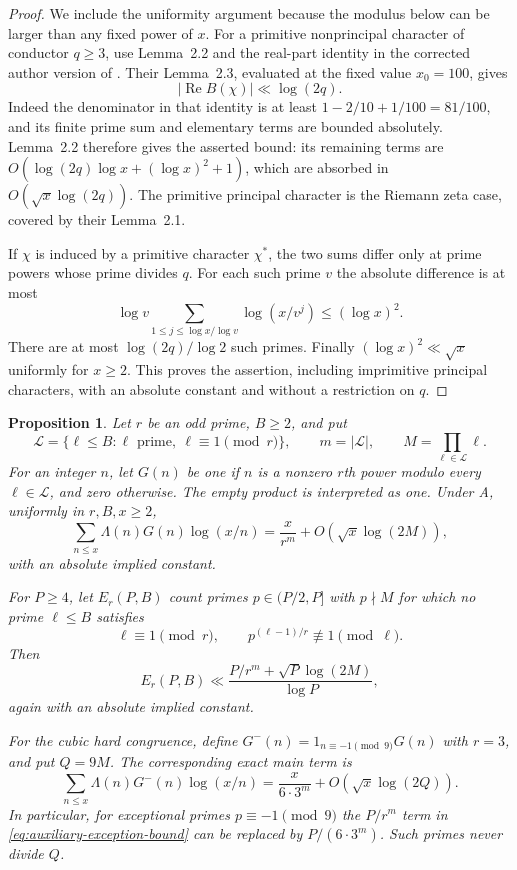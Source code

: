\documentclass[11pt]{article}
\newtheorem{proposition}[theorem]{Proposition}
\theoremstyle{definition}
\theoremstyle{remark}
\begin{document}
\begin{proof}
We include the uniformity argument because the modulus below can be
larger than any fixed power of $x$.
For a primitive nonprincipal character of conductor $q\ge3$, use
Lemma~2.2 and the real-part identity in the corrected author version
of \citet[corrected author pp.~5--7, Lemmas~2.1--2.3]{LLS2015}.  Their Lemma~2.3, evaluated at the fixed value
$x_0=100$, gives
\[
 |\operatorname{Re}B(\chi)|\ll\log(2q).
\]
Indeed the denominator in that identity is at least
$1-2/10+1/100=81/100$, and its finite prime sum and elementary
terms are bounded absolutely.  Lemma~2.2 therefore gives the asserted
bound: its remaining terms are
$O(\log(2q)\log x+(\log x)^2+1)$, which are absorbed in
$O(\sqrt{x}\log(2q))$.  The primitive principal character is
the Riemann zeta case, covered by their Lemma~2.1.

If $\chi$ is induced by a primitive character $\chi^*$, the two sums
differ only at prime powers whose prime divides $q$.  For each such
prime $v$ the absolute difference is at most
\[
 \log v\sum_{1\le j\le\log x/\log v}\log(x/v^j)
 \le(\log x)^2.
\]
There are at most $\log(2q)/\log2$ such primes.  Finally
$(\log x)^2\ll\sqrt{x}$ uniformly for $x\ge2$.
This proves the assertion, including imprimitive principal characters,
with an absolute constant and without a restriction on $q$.
\end{proof}

\begin{proposition}\label{prop:auxiliary-character-sieve}
Let $r$ be an odd prime, $B\ge2$, and put
\[
 \mathcal L=\{\ell\le B:\ell\text{ prime},\ \ell\equiv1\pmod r\},
 \qquad m=|\mathcal L|,\qquad M=\prod_{\ell\in\mathcal L}\ell.
\]
For an integer $n$, let $G(n)$ be one if $n$ is a nonzero $r$th
power modulo every $\ell\in\mathcal L$, and zero otherwise.
The empty product is interpreted as one.  Under A, uniformly in
$r,B,x\ge2$,
\begin{equation}\label{eq:auxiliary-sieve-log-sum}
 \sum_{n\le x}\Lambda(n)G(n)\log(x/n)
 =\frac{x}{r^m}+O\!\left(\sqrt{x}\log(2M)\right),
\end{equation}
with an absolute implied constant.

For $P\ge4$, let $E_r(P,B)$ count primes $p\in(P/2,P]$ with
$p\nmid M$ for which no prime $\ell\le B$ satisfies
\[
 \ell\equiv1\pmod r,
 \qquad p^{(\ell-1)/r}\not\equiv1\pmod\ell.
\]
Then
\begin{equation}\label{eq:auxiliary-exception-bound}
 E_r(P,B)\ll
 \frac{P/r^m+\sqrt P\log(2M)}{\log P},
\end{equation}
again with an absolute implied constant.

For the cubic hard congruence, define
$G^-(n)=1_{n\equiv-1\pmod9}G(n)$ with $r=3$, and put $Q=9M$.
The corresponding exact main term is
\begin{equation}\label{eq:cubic-hard-sieve-log-sum}
 \sum_{n\le x}\Lambda(n)G^-(n)\log(x/n)
 =\frac{x}{6\cdot3^m}+O\!\left(\sqrt{x}\log(2Q)\right).
\end{equation}
In particular, for exceptional primes $p\equiv-1\pmod9$ the
$P/r^m$ term in \eqref{eq:auxiliary-exception-bound} can be replaced
by $P/(6\cdot3^m)$.  Such primes never divide $Q$.
\end{proposition}
\end{document}
